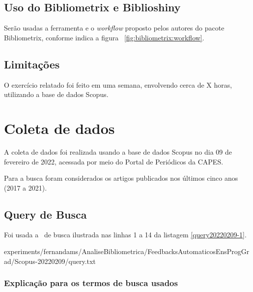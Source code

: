 
\subsection{Uso do Bibliometrix e Biblioshiny}
Serão usadas a ferramenta e o \textit{workflow} proposto pelos autores do pacote Bibliometrix, conforme indica a figura ~\ref{fig:bibliometrix:workflow}.

\subsection{Limitações} 

O exercício relatado foi feito em uma semana, envolvendo cerca de X horas, utilizando a base de dados Scopus.

\section{Coleta de dados \label{FeedAuto:coleta}}

A coleta de dados foi realizada usando a base de dados Scopus no dia 09 de fevereiro de 2022, acessada por meio do Portal de Periódicos da CAPES.

Para a busca foram considerados os artigos publicados nos últimos cinco anos (2017 a 2021).

\subsection{Query de Busca}

Foi usada a \query\  de busca ilustrada nas linhas 1 a 14 da listagem \ref{query20220209-1}.


{experiments/fernandams/AnaliseBibliometrica/FeedbacksAutomaticosEnsProgGrad/Scopus-20220209/query.txt}

\subsubsection{Explicação para os termos de busca usados\label{FeedAuto:query}}

